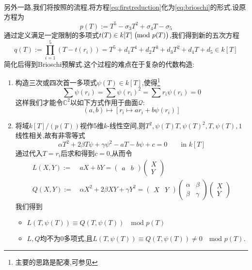 另外一路,我们将按照\cite[5.8]{shurman1997geometry}的流程,将方程\eqref{eq:firstreduction}化为\eqref{eq:brioschi}的形式.设原方程为
$$p(T):=T^5-\sigma_3 T^2+\sigma_4 T -\sigma_5$$
通过定义满足一定限制的多项式$t(T) \in k[T] \; \big(\hspace{-0.25cm}\mod p(T)\big)$,我们得到新的五次方程
\begin{equation}\label{eq:closetoBri}
q(T):=\prod_{i=1}^{5} (T-t(r_i))=T^5+d_1T^4+d_2T^3+d_3T^2+d_4T+d_5 \in k[T]
\end{equation}
简化后得到Brioschi预解式.这个过程的难点在于复杂的代数构造:
\begin{enumerate}[Step 1.]
	\item 构造三次或四次首一多项式$\psi(T) \in k[T]$,使得\footnote{主要的思路是配凑,可参见\cite[exercise 5.8.1]{shurman1997geometry}}
	$$\sum \psi(r_i)=\sum \psi(r_i)^2=\sum r_i\psi(r_i)=0$$
	这样我们才能令$\mathbb{C}^2$以如下方式作用于曲面$\mathcal{Q}$:
	$$(a,b) \longmapsto [r_i \mapsto ar_i+b\psi(r_i)]$$
	\item 将域$k[T]/(p(T))$视作5维$k$-线性空间,则$T^2,\psi(T) T ,\psi(T)^2, T,\psi(T),1$线性相关,故有非零等式
	$$\alpha T^2+2\beta T \psi +\gamma \psi^2 -aT-b\psi+c=0 	\qquad \text{in $k[T]$}$$
	通过代入$T=r_i$后求和得到$c=0$,从而令
	\begin{equation*}
	\begin{aligned}
	L(X,Y):=&\,aX+bY=\begin{pmatrix}
	a&b
	\end{pmatrix}
	\begin{pmatrix}
	X\\Y
	\end{pmatrix}\\
	Q(X,Y):=&\,\alpha X^2+2\beta XY+\gamma Y^2=\begin{pmatrix}
	X & Y
	\end{pmatrix}
	\begin{pmatrix}
	\alpha & \beta\\
	\beta & \gamma
	\end{pmatrix}
	\begin{pmatrix}
	X \\ Y
	\end{pmatrix}
	\end{aligned}
	\end{equation*}
	我们得到
	\begin{itemize}
		\item $L(T,\psi(T))\equiv Q(T,\psi(T)) \quad \text{mod } p(T)$
		\item $L,Q$均不为$0$多项式,且$L(T,\psi(T))\equiv Q(T,\psi(T)) \neq 0 \quad \text{mod } p(T)$.

\end{itemize}
\end{enumerate}
